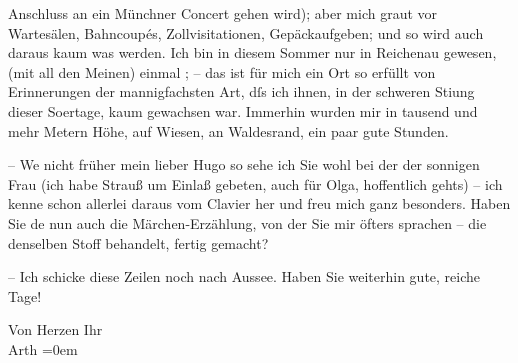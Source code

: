                Anschluss an ein Münchner Concert\strikeout{)} gehen wird); aber mich graut vor Wartesälen,
               Bahncoupés, Zollvisitationen, Gepäckaufgeben; und so wird auch daraus kaum was
               werden. Ich bin in diesem Sommer {\pb}nur in Reichenau gewesen, \label{K_L02327-3v}\label{K_L02327-3} (mit all den Meinen) einmal \label{K_L02327-4v}\label{K_L02327-4}; – das ist für mich ein Ort so erfüllt von Erinnerungen der mannigfachsten
               Art, dſs ich ihnen, in der schweren Sti{\geminationm}ung dieser So{\geminationm}ertage, kaum gewachsen war. Immerhin wurden mir in
               tausend und mehr Metern Höhe, auf Wiesen, an Waldesrand, ein paar gute Stunden.\pend
           
\pstart
           – We{\geminationn} nicht früher mein lieber Hugo so sehe ich Sie wohl
               bei der \label{K_L02327-5v}\label{K_L02327-5} der sonnigen Frau (ich
               habe Strauß um Einlaß gebeten, auch für Olga, hoffentlich gehts) – ich kenne schon
               allerlei daraus vom Clavier her und freu mich ganz besonders. Haben Sie de{\geminationn} nun auch die Märchen-Erzählung, von der Sie mir öfters sprachen – die
               denselben Stoff behandelt, fertig gemacht? \pend
           
\pstart
           – Ich schicke diese Zeilen noch nach Aussee.
               Haben Sie weiterhin gute, reiche Tage! \pend
           
\pstart
           Von Herzen Ihr{\\[\baselineskip]}\spacefill\mbox{Arth}\pend
           \leftskip=0em{}\endnumbering{}  
      